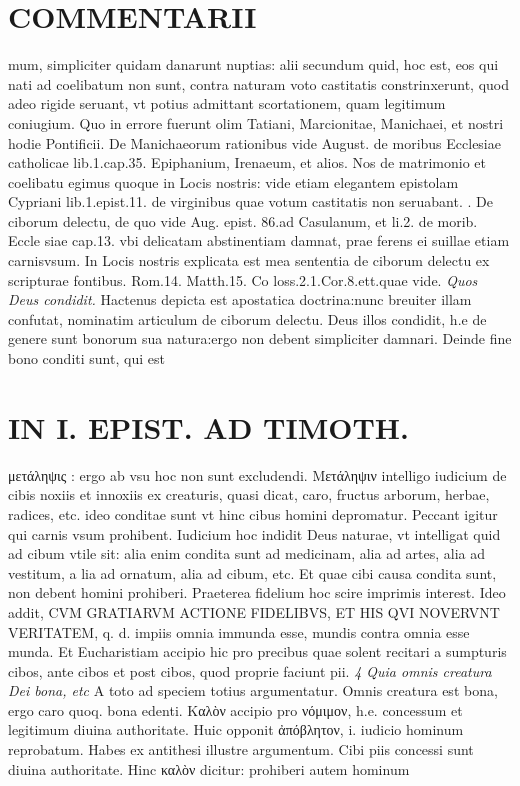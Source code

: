 \documentclass{article}
\begin{document}
\begin{pages}
\section*{COMMENTARII }
\marginpar{[ p.90 ]}\pstart mum, simpliciter quidam danarunt nuptias: alii secundum quid, hoc est, eos qui nati ad coelibatum non sunt, contra naturam voto castitatis constrinxerunt, quod adeo rigide seruant, vt potius admittant scortationem, quam legitimum coniugium. Quo in errore fuerunt olim Tatiani, Marcionitae, Manichaei, et nostri hodie Pontificii. De Manichaeorum rationibus vide August. de moribus Ecclesiae catholicae lib.1.cap.35. Epiphanium, Irenaeum, et alios. Nos de matrimonio et coelibatu egimus quoque in Locis nostris: vide etiam elegantem epistolam Cypriani lib.1.epist.11. de virginibus quae votum castitatis non seruabant.  \pend{}. De ciborum delectu, de quo vide Aug. epist. 86.ad Casulanum, et li.2. de morib. Eccle siae cap.13. vbi delicatam abstinentiam damnat, prae ferens ei suillae etiam carnisvsum. In Locis nostris explicata est mea sententia de ciborum delectu ex scripturae fontibus. Rom.14. Matth.15. Co loss.2.1.Cor.8.ett.quae vide.  \pend
\textit{Quos Deus condidit. }\pstart Hactenus depicta est apostatica doctrina:nunc breuiter illam confutat, nominatim articulum de ciborum delectu. Deus illos condidit, h.e de genere sunt bonorum sua natura:ergo non debent simpliciter damnari.  \pend\pstart Deinde fine bono conditi sunt, qui est  \pend
\section*{IN I. EPIST. AD TIMOTH. }
\marginpar{[ p.91 ]}\pstart μετάληψις : ergo ab vsu hoc non sunt excludendi. Μετάληψιν intelligo iudicium de cibis noxiis et innoxiis ex creaturis, quasi dicat, caro, fructus arborum, herbae, radices, etc. ideo conditae sunt vt hinc cibus homini depromatur. Peccant igitur qui carnis vsum prohibent. Iudicium hoc indidit Deus naturae, vt intelligat quid ad cibum vtile sit: alia enim condita sunt ad medicinam, alia ad artes, alia ad vestitum, a lia ad ornatum, alia ad cibum, etc. Et quae cibi causa condita sunt, non debent homini prohiberi. Praeterea fidelium hoc scire imprimis interest. Ideo addit, CVM GRATIARVM ACTIONE FIDELIBVS, ET HIS QVI NOVERVNT VERITATEM, q. d. impiis omnia immunda esse, mundis contra omnia esse munda. Et Eucharistiam accipio hic pro precibus quae solent recitari a sumpturis cibos, ante cibos et post cibos, quod proprie faciunt pii.  \pend
\textit{4 Quia omnis creatura Dei bona, etc }\pstart A toto ad speciem totius argumentatur. Omnis creatura est bona, ergo caro quoq. bona edenti. Καλὸν accipio pro νόμιμον, h.e. concessum et legitimum diuina authoritate. Huic opponit ἀπόβλητον, i. iudicio hominum reprobatum. Habes ex antithesi illustre argumentum. Cibi piis concessi sunt diuina authoritate. Hinc καλὸν dicitur: prohiberi autem hominum  \pend

\end{pages}
\end{document}
